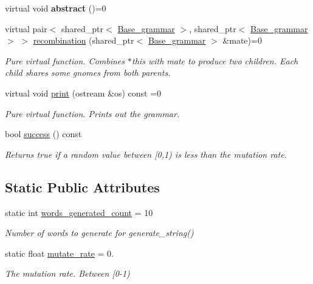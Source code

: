 \begin{DoxyCompactItemize}
\mbox{\label{classBase__grammar_a7f8d37332cf540279e7fcc6b9b97de0f}} 
virtual void {\bfseries abstract} ()=0
\item 
virtual pair$<$ shared\+\_\+ptr$<$ \mbox{\hyperlink{classBase__grammar}{Base\+\_\+grammar}} $>$, shared\+\_\+ptr$<$ \mbox{\hyperlink{classBase__grammar}{Base\+\_\+grammar}} $>$ $>$ \mbox{\hyperlink{classBase__grammar_a60e0296e1254df779af8be718d465696}{recombination}} (shared\+\_\+ptr$<$ \mbox{\hyperlink{classBase__grammar}{Base\+\_\+grammar}} $>$ \&mate)=0
\begin{DoxyCompactList}\small\item\em Pure virtual function. Combines $\ast$this with mate to produce two children. Each child shares some gnomes from both parents. \end{DoxyCompactList}\item 
virtual void \mbox{\hyperlink{classBase__grammar_acc90ffd8e04ba0a51750a15c158ce790}{print}} (ostream \&os) const =0
\begin{DoxyCompactList}\small\item\em Pure virtual function. Prints out the grammar. \end{DoxyCompactList}\item 
bool \mbox{\hyperlink{classBase__grammar_a7fdb4f3880b7cba62638bc722c1ad644}{success}} () const
\begin{DoxyCompactList}\small\item\em Returns true if a random value between \mbox{[}0,1) is less than the mutation rate. \end{DoxyCompactList}\end{DoxyCompactItemize}
\subsection*{Static Public Attributes}
\begin{DoxyCompactItemize}
\item 
\mbox{\label{classBase__grammar_a9d07ed22192dd42ed77acc0930f627bc}} 
static int \mbox{\hyperlink{classBase__grammar_a9d07ed22192dd42ed77acc0930f627bc}{words\+\_\+generated\+\_\+count}} = 10
\begin{DoxyCompactList}\small\item\em Number of words to generate for generate\+\_\+string() \end{DoxyCompactList}\item 
\mbox{\label{classBase__grammar_aebe2216bc0bfd1139d63e5e3dec3c8e8}} 
static float \mbox{\hyperlink{classBase__grammar_aebe2216bc0bfd1139d63e5e3dec3c8e8}{mutate\+\_\+rate}} = 0.
\begin{DoxyCompactList}\small\item\em The mutation rate. Between \mbox{[}0-\/1) \end{DoxyCompactList}\end{DoxyCompactItemize}
